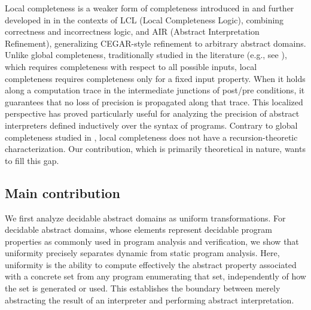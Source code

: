 \documentclass[runningheads]{llncs}
\begin{document}
\smallskip

Local completeness is a weaker form of completeness introduced in \cite{BruniGGR21} and further developed in \cite{BruniGGR23,BruniGGR22} in the contexts of LCL (Local Completeness Logic), combining correctness and incorrectness logic, and AIR (Abstract Interpretation Refinement), generalizing CEGAR-style refinement to arbitrary abstract domains.
%
Unlike global completeness, traditionally studied in the literature (e.g., see \cite{GRS00}), which requires completeness with respect to all possible inputs, local completeness requires completeness only for a fixed input property. When it holds along a computation trace in the intermediate junctions of post/pre conditions, it guarantees that no loss of precision is propagated along that trace. This localized perspective has proved particularly useful for analyzing the precision of abstract interpreters defined inductively over the syntax of programs.
%
Contrary to global completeness studied in \cite{GiacobazziLR15}, local completeness does not have a recursion-theoretic characterization. Our contribution, which is primarily theoretical in nature, wants to fill this gap.

\subsection{Main contribution}
%


We first analyze decidable abstract domains as uniform transformations. 
For decidable abstract domains, whose elements represent decidable program properties as commonly used in program analysis and verification, we show that uniformity precisely separates dynamic from static program analysis. Here, uniformity is the ability to compute effectively the abstract property associated with a concrete set from any program enumerating that set, independently of how the set is generated or used. This establishes the boundary between merely abstracting the result of an interpreter and performing abstract interpretation.
\end{document}
